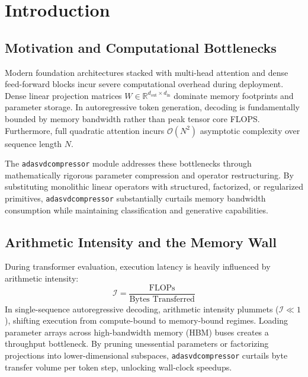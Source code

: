 \section{Introduction}

\subsection{Motivation and Computational Bottlenecks}
Modern foundation architectures stacked with multi-head attention and dense feed-forward blocks incur severe computational overhead during deployment. Dense linear projection matrices $W \in \mathbb{R}^{d_{\text{out}} \times d_{\text{in}}}$ dominate memory footprints and parameter storage. In autoregressive token generation, decoding is fundamentally bounded by memory bandwidth rather than peak tensor core FLOPS. Furthermore, full quadratic attention incurs $\mathcal{O}(N^2)$ asymptotic complexity over sequence length $N$.

The \texttt{adasvdcompressor} module addresses these bottlenecks through mathematically rigorous parameter compression and operator restructuring. By substituting monolithic linear operators with structured, factorized, or regularized primitives, \texttt{adasvdcompressor} substantially curtails memory bandwidth consumption while maintaining classification and generative capabilities.

\subsection{Arithmetic Intensity and the Memory Wall}
During transformer evaluation, execution latency is heavily influenced by arithmetic intensity:
\[
\mathcal{I} = \frac{\text{FLOPs}}{\text{Bytes Transferred}}
\]
In single-sequence autoregressive decoding, arithmetic intensity plummets ($\mathcal{I} \ll 1$), shifting execution from compute-bound to memory-bound regimes. Loading parameter arrays across high-bandwidth memory (HBM) buses creates a throughput bottleneck. By pruning unessential parameters or factorizing projections into lower-dimensional subspaces, \texttt{adasvdcompressor} curtails byte transfer volume per token step, unlocking wall-clock speedups.

